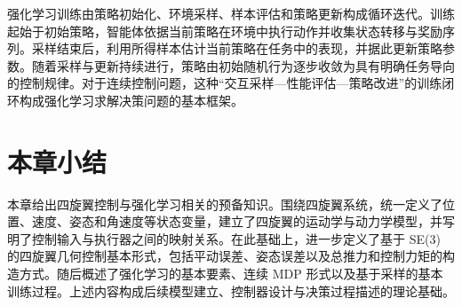强化学习训练由策略初始化、环境采样、样本评估和策略更新构成循环迭代。训练起始于初始策略，智能体依据当前策略在环境中执行动作并收集状态转移与奖励序列。采样结束后，利用所得样本估计当前策略在任务中的表现，并据此更新策略参数。随着采样与更新持续进行，策略由初始随机行为逐步收敛为具有明确任务导向的控制规律。对于连续控制问题，这种“交互采样---性能评估---策略改进”的训练闭环构成强化学习求解决策问题的基本框架。

\section{本章小结}

本章给出四旋翼控制与强化学习相关的预备知识。围绕四旋翼系统，统一定义了位置、速度、姿态和角速度等状态变量，建立了四旋翼的运动学与动力学模型，并写明了控制输入与执行器之间的映射关系。在此基础上，进一步定义了基于 SE(3) 的四旋翼几何控制基本形式，包括平动误差、姿态误差以及总推力和控制力矩的构造方式。随后概述了强化学习的基本要素、连续 MDP 形式以及基于采样的基本训练过程。上述内容构成后续模型建立、控制器设计与决策过程描述的理论基础。
